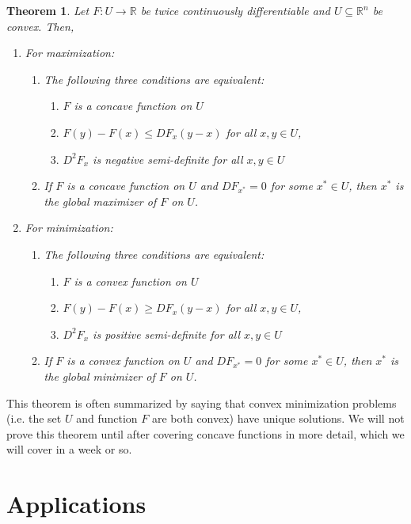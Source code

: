\documentclass[12pt,reqno]{amsart}
\newtheorem{theorem}{Theorem}[section]
\theoremstyle{definition}
\def\R{\mathbb{R}}
\renewcommand{\to}{{\rightarrow}}
\begin{document}
\begin{theorem}
  Let $F: U \to \R$ be twice continuously differentiable and $U
  \subseteq \R^n$ be convex. Then,
  \begin{enumerate}
  \item For maximization:
    \begin{enumerate}
    \item The following three conditions are equivalent:
      \begin{enumerate}
      \item $F$ is a concave function on $U$
      \item $F(y) - F(x) \leq DF_x(y-x)$ for all $x,y \in U$,
      \item $D^2 F_x$ is negative semi-definite for all $x, y \in U$
      \end{enumerate}
    \item If $F$ is a concave function on $U$ and $DF_{x^*} = 0$ for
      some $x^* \in U$, then
      $x^*$ is the global maximizer of $F$ on $U$.
    \end{enumerate}
  \item For minimization:
    \begin{enumerate}
    \item The following three conditions are equivalent:
      \begin{enumerate}
      \item $F$ is a convex function on $U$
      \item $F(y) - F(x) \geq DF_x(y-x)$ for all $x,y \in U$,
      \item $D^2 F_x$ is positive semi-definite for all $x, y \in U$
      \end{enumerate}
    \item If $F$ is a convex function on $U$ and $DF_{x^*} = 0$ for
      some $x^* \in U$, then
      $x^*$ is the global minimizer of $F$ on $U$.
    \end{enumerate}
  \end{enumerate}
\end{theorem}
This theorem is often summarized by saying that convex minimization
problems (i.e. the set $U$ and function $F$ are both convex) have
unique solutions.  
We will not prove this theorem until after covering concave functions
in more detail, which we will cover in a week or so.

\section{Applications}
\end{document}
